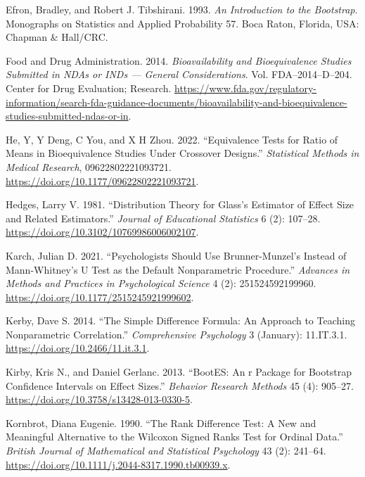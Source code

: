 \documentclass[
]{interact}
\newlength{\cslhangindent}
\newlength{\cslentryspacingunit} %
\newenvironment{CSLReferences}[2] %
 {%
  \setlength{\parindent}{0pt}
  \ifodd #1
  \let\oldpar\par
  \def\par{\hangindent=\cslhangindent\oldpar}
  \fi
  \setlength{\parskip}{#2\cslentryspacingunit}
 }%
 {}
\begin{document}
\begin{CSLReferences}{1}{0}
\leavevmode{}%
Efron, Bradley, and Robert J. Tibshirani. 1993. \emph{An Introduction to
the Bootstrap}. Monographs on Statistics and Applied Probability 57.
Boca Raton, Florida, USA: Chapman \& Hall/CRC.

\leavevmode{}%
Food and Drug Administration. 2014. \emph{Bioavailability and
Bioequivalence Studies Submitted in NDAs or INDs --- General
Considerations}. Vol. FDA--2014--D--204. Center for Drug Evaluation;
Research.
\url{https://www.fda.gov/regulatory-information/search-fda-guidance-documents/bioavailability-and-bioequivalence-studies-submitted-ndas-or-in}.

\leavevmode{}%
He, Y, Y Deng, C You, and X H Zhou. 2022. {``Equivalence Tests for Ratio
of Means in Bioequivalence Studies Under Crossover Designs.''}
\emph{Statistical Methods in Medical Research}, 09622802221093721.
\url{https://doi.org/10.1177/09622802221093721}.

\leavevmode{}%
Hedges, Larry V. 1981. {``Distribution Theory for Glass's Estimator of
Effect Size and Related Estimators.''} \emph{Journal of Educational
Statistics} 6 (2): 107--28.
\url{https://doi.org/10.3102/10769986006002107}.

\leavevmode{}%
Karch, Julian D. 2021. {``Psychologists Should Use Brunner-Munzel{'}s
Instead of Mann-Whitney{'}s U Test as the Default Nonparametric
Procedure.''} \emph{Advances in Methods and Practices in Psychological
Science} 4 (2): 251524592199960.
\url{https://doi.org/10.1177/2515245921999602}.

\leavevmode{}%
Kerby, Dave S. 2014. {``The Simple Difference Formula: An Approach to
Teaching Nonparametric Correlation.''} \emph{Comprehensive Psychology} 3
(January): 11.IT.3.1. \url{https://doi.org/10.2466/11.it.3.1}.

\leavevmode{}%
Kirby, Kris N., and Daniel Gerlanc. 2013. {``{BootES}: An r Package for
Bootstrap Confidence Intervals on Effect Sizes.''} \emph{Behavior
Research Methods} 45 (4): 905--27.
\url{https://doi.org/10.3758/s13428-013-0330-5}.

\leavevmode{}%
Kornbrot, Diana Eugenie. 1990. {``The Rank Difference Test: A New and
Meaningful Alternative to the Wilcoxon Signed Ranks Test for Ordinal
Data.''} \emph{British Journal of Mathematical and Statistical
Psychology} 43 (2): 241--64.
\url{https://doi.org/10.1111/j.2044-8317.1990.tb00939.x}.


\end{CSLReferences}
\end{document}
